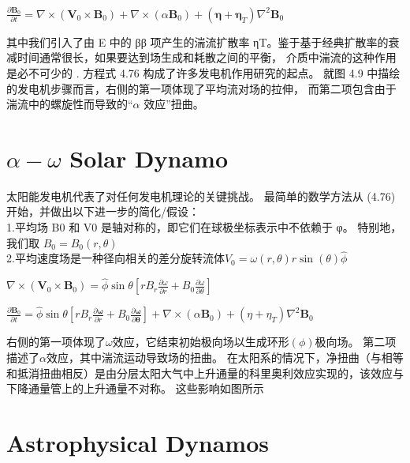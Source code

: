 \documentclass[12pt, a4paper, oneside]{ctexart}
\begin{document}
\begin{spacing}{2.0}
\begin{center}
    $\displaystyle\frac{\partial\mathbf{B}_0}{\partial t}=\nabla\times\left(\mathbf{V}_0\times\mathbf{B}_0\right)+\nabla\times\left(\alpha\mathbf{B}_0\right)+\left(\mathbf{\eta}+\mathbf{\eta}_T\right)\nabla^2\mathbf{B}_0$
\end{center}
其中我们引入了由 E 中的 ββ 项产生的湍流扩散率 ηT。鉴于基于经典扩散率的衰减时间通常很长，如果要达到场生成和耗散之间的平衡，
介质中湍流的这种作用是必不可少的 . 方程式 4.76 构成了许多发电机作用研究的起点。 就图 4.9 中描绘的发电机步骤而言，右侧的第一项体现了平均流对场的拉伸，
而第二项包含由于湍流中的螺旋性而导致的“$\alpha$ 效应”扭曲。
\section{$\alpha−\omega$ Solar Dynamo}

太阳能发电机代表了对任何发电机理论的关键挑战。 最简单的数学方法从 (4.76) 开始，并做出以下进一步的简化/假设：
\\
1.平均场 B0 和 V0 是轴对称的，即它们在球极坐标表示中不依赖于 φ。 特别地，我们取 $B_0 = B_0(r, \theta)$\\
2.平均速度场是一种径向相关的差分旋转流体$V_0 = \omega(r, \theta)r \sin(\theta)\hat{\phi}$

\begin{center}
    $\displaystyle\nabla\times(\mathbf{V}_0\times\mathbf{B}_0)=\hat{\phi}\sin\theta\left[r B_r\frac{\partial\omega}{\partial r}+B_0\frac{\partial\omega}{\partial\theta}\right]$
\end{center}

\begin{center}
    $\displaystyle\frac{\partial\mathbf{B}_0}{\partial t}=\hat{\phi}\sin\theta\left[rB_r\frac{\partial\mathbf{\omega}}{\partial r}+B_0\frac{\partial\mathbf{\omega}}{\partial\mathbf{\theta}}\right]+\nabla\times\left(\alpha\mathbf{B}_0\right)+\left(\mathfrak{\eta}+\mathfrak{\eta}_T\right)\nabla^2\mathbf{B}_0$
\end{center}

右侧的第一项体现了$\omega$效应，它结束初始极向场以生成环形$ (\phi) $极向场。 第二项描述了$\alpha$效应，其中湍流运动导致场的扭曲。 
在太阳系的情况下，净扭曲（与相等和抵消扭曲相反）是由分层太阳大气中上升通量的科里奥利效应实现的，该效应与下降通量管上的上升通量不对称。 这些影响如图所示


\section{Astrophysical Dynamos}


\end{spacing}
\end{document}
